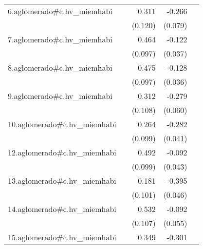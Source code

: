 {\begin{longtable}{l*{4}{D{.}{.}{-1}}}
\addlinespace
6.aglomerado#c.hv\_miemhabi&                     &       0.311\sym{**} &      -0.266\sym{***}&                     \\
            &                     &     (0.120)         &     (0.079)         &                     \\
\addlinespace
7.aglomerado#c.hv\_miemhabi&                     &       0.464\sym{***}&      -0.122\sym{**} &                     \\
            &                     &     (0.097)         &     (0.037)         &                     \\
\addlinespace
8.aglomerado#c.hv\_miemhabi&                     &       0.475\sym{***}&      -0.128\sym{***}&                     \\
            &                     &     (0.097)         &     (0.036)         &                     \\
\addlinespace
9.aglomerado#c.hv\_miemhabi&                     &       0.312\sym{**} &      -0.279\sym{***}&                     \\
            &                     &     (0.108)         &     (0.060)         &                     \\
\addlinespace
10.aglomerado#c.hv\_miemhabi&                     &       0.264\sym{**} &      -0.282\sym{***}&                     \\
            &                     &     (0.099)         &     (0.041)         &                     \\
\addlinespace
12.aglomerado#c.hv\_miemhabi&                     &       0.492\sym{***}&      -0.092\sym{*}  &                     \\
            &                     &     (0.099)         &     (0.043)         &                     \\
\addlinespace
13.aglomerado#c.hv\_miemhabi&                     &       0.181         &      -0.395\sym{***}&                     \\
            &                     &     (0.101)         &     (0.046)         &                     \\
\addlinespace
14.aglomerado#c.hv\_miemhabi&                     &       0.532\sym{***}&      -0.092         &                     \\
            &                     &     (0.107)         &     (0.055)         &                     \\
\addlinespace
15.aglomerado#c.hv\_miemhabi&                     &       0.349\sym{**} &      -0.301\sym{***}&                     \\

\end{longtable}}
